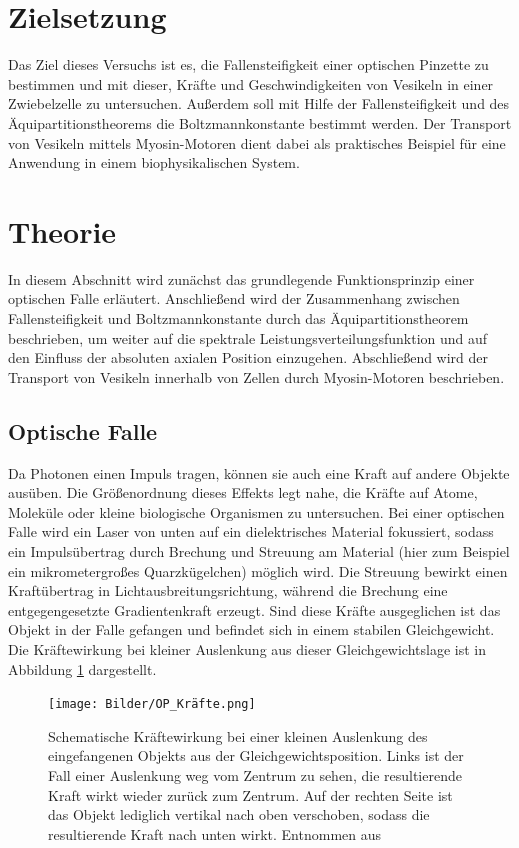 \section*{Zielsetzung}
Das Ziel dieses Versuchs ist es, die Fallensteifigkeit einer optischen Pinzette zu bestimmen und mit dieser, Kräfte und Geschwindigkeiten von Vesikeln in einer Zwiebelzelle zu untersuchen.
Außerdem soll mit Hilfe der Fallensteifigkeit und des Äquipartitionstheorems die Boltzmannkonstante bestimmt werden.
Der Transport von Vesikeln mittels Myosin-Motoren dient dabei als praktisches Beispiel für eine Anwendung in einem biophysikalischen System.

\section{Theorie}
In diesem Abschnitt wird zunächst das grundlegende Funktionsprinzip einer optischen Falle erläutert.
Anschließend wird der Zusammenhang zwischen Fallensteifigkeit und Boltzmannkonstante durch das Äquipartitionstheorem beschrieben, um
weiter auf die spektrale Leistungsverteilungsfunktion und auf den Einfluss der absoluten axialen Position einzugehen.
Abschließend wird der Transport von Vesikeln innerhalb von Zellen durch Myosin-Motoren beschrieben.
\subsection{Optische Falle}
Da Photonen einen Impuls tragen, können sie auch eine Kraft auf andere Objekte ausüben.
Die Größenordnung dieses Effekts legt nahe, die Kräfte auf Atome, Moleküle oder kleine biologische Organismen zu untersuchen.
Bei einer optischen Falle wird ein Laser von unten auf ein dielektrisches Material fokussiert, sodass ein Impulsübertrag durch 
Brechung und Streuung am Material (hier zum Beispiel ein mikrometergroßes Quarzkügelchen) möglich wird.
Die Streuung bewirkt einen Kraftübertrag in Lichtausbreitungsrichtung, 
während die Brechung eine entgegengesetzte Gradientenkraft erzeugt. 
Sind diese Kräfte ausgeglichen ist das Objekt in der Falle gefangen 
und befindet sich in einem stabilen Gleichgewicht. Die Kräftewirkung bei kleiner Auslenkung
aus dieser Gleichgewichtslage ist in Abbildung \ref{fig:Kräfte} dargestellt.




\begin{figure}[H]
    \centering\captionsetup{format=plain}
    \texttt{[image: Bilder/OP\_Kräfte.png]}
    \caption{Schematische Kräftewirkung bei einer kleinen Auslenkung des eingefangenen Objekts aus der Gleichgewichtsposition. Links ist der Fall einer Auslenkung weg vom Zentrum zu sehen, die resultierende Kraft wirkt wieder zurück zum Zentrum. Auf der rechten Seite ist das Objekt lediglich vertikal nach oben verschoben, sodass die resultierende Kraft nach unten wirkt. Entnommen aus \cite{ref10}}
    \label{fig:Kräfte}
\end{figure}

